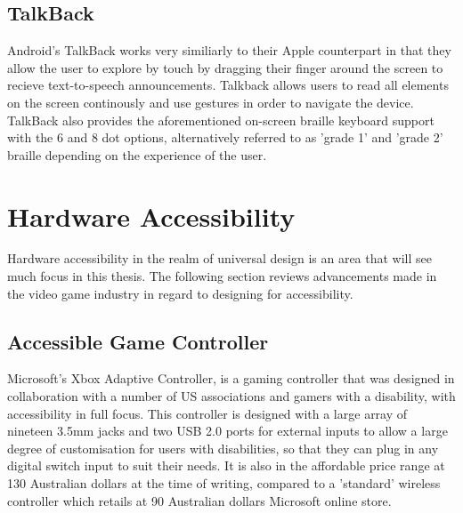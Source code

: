 
\subsection{TalkBack}
Android's TalkBack works very similiarly to their Apple counterpart in that they allow the user to explore by touch by dragging their finger around the screen to recieve text-to-speech announcements\cite{android}.
Talkback allows users to read all elements on the screen continously and use gestures in order to navigate the device. %
TalkBack also provides the aforementioned on-screen braille keyboard support with the 6 and 8 dot options, alternatively referred to as 'grade 1' and 'grade 2' braille depending on the experience of the user.


\section{Hardware Accessibility}

Hardware accessibility in the realm of universal design is an area that will see much focus in this thesis. %
The following section reviews advancements made in the video game industry in regard to designing for accessibility.


\subsection{Accessible Game Controller}

Microsoft's Xbox Adaptive Controller\cite{adaptive}, is a gaming controller that was designed in collaboration with a number of US associations and gamers with a disability, with accessibility in full focus.
This controller is designed with a large array of nineteen 3.5mm jacks and two USB 2.0 ports for external inputs\cite{adaptive} to allow a large degree of customisation for users with disabilities, so that they can plug in any digital switch input to suit their needs.
It is also in the affordable price range at 130 Australian dollars\cite{accessiblecontroller} at the time of writing, compared to a 'standard' wireless controller which retails at 90 Australian dollars\cite{standardcontroller} Microsoft online store.

